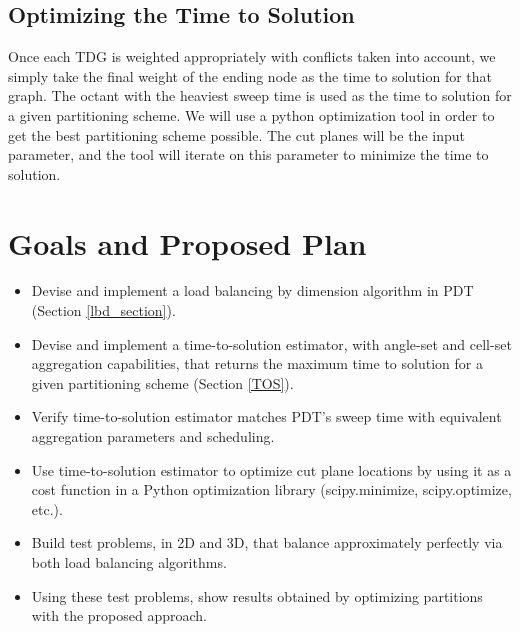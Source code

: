 \documentclass[11pt, letterpaper,titlepage,oneside]{article}
\begin{document}
\subsection{Optimizing the Time to Solution}\label{optimize}

Once each TDG is weighted appropriately with conflicts taken into account, we simply take the final weight of the ending node as the time to solution for that graph. The octant with the heaviest sweep time is used as the time to solution for a given partitioning scheme. We will use a python optimization tool in order to get the best partitioning scheme possible. The cut planes will be the input parameter, and the tool will iterate on this parameter to minimize the time to solution. 

\section{Goals and Proposed Plan}

\begin{itemize}
\item Devise and implement a load balancing by dimension algorithm in PDT (Section \ref{lbd_section}).
\item Devise and implement a time-to-solution estimator, with angle-set and cell-set aggregation capabilities, that returns the maximum time to solution for a given partitioning scheme (Section \ref{TOS}).
\item Verify time-to-solution estimator matches PDT's sweep time with equivalent aggregation parameters and scheduling.
\item Use time-to-solution estimator to optimize cut plane locations by using it as a cost function in a Python optimization library (scipy.minimize, scipy.optimize, etc.). 
\item Build test problems, in 2D and 3D, that balance approximately perfectly via both load balancing algorithms.
\item Using these test problems, show results obtained by optimizing partitions with the proposed approach.
\end{itemize}




\end{document}

